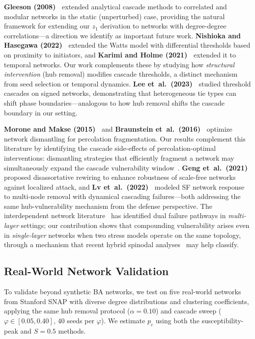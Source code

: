 \documentclass[aps,pre,twocolumn,superscriptaddress,showpacs]{revtex4-2}
\newcommand{\pc}{p_c}
\begin{document}
\textbf{Gleeson (2008)~\cite{Gleeson2008}} extended analytical cascade methods to correlated and modular networks in the static (unperturbed) case, providing the natural framework for extending our $z_1$ derivation to networks with degree-degree correlations---a direction we identify as important future work. \textbf{Nishioka and Hasegawa (2022)~\cite{Nishioka2022}} extended the Watts model with differential thresholds based on proximity to initiators, and \textbf{Karimi and Holme (2021)~\cite{Karimi2021}} extended it to temporal networks. Our work complements these by studying how \emph{structural intervention} (hub removal) modifies cascade thresholds, a distinct mechanism from seed selection or temporal dynamics. \textbf{Lee et~al.\ (2023)~\cite{Lee2023}} studied threshold cascades on signed networks, demonstrating that heterogeneous tie types can shift phase boundaries---analogous to how hub removal shifts the cascade boundary in our setting.

\textbf{Morone and Makse (2015)~\cite{Morone2015}} and \textbf{Braunstein et~al.\ (2016)~\cite{Braunstein2016}} optimize network dismantling for percolation fragmentation. Our results complement this literature by identifying the cascade side-effects of percolation-optimal interventions: dismantling strategies that efficiently fragment a network may simultaneously expand the cascade vulnerability window~\cite{Artime2024}. \textbf{Geng et~al.\ (2021)~\cite{Geng2021}} proposed disassortative rewiring to enhance robustness of scale-free networks against localized attack, and \textbf{Lv et~al.\ (2022)~\cite{Lv2022}} modeled SF network response to multi-node removal with dynamical cascading failures---both addressing the same hub-vulnerability mechanism from the defense perspective. The interdependent network literature~\cite{Xu2021,Brummitt2012} has identified dual failure pathways in \emph{multi-layer} settings; our contribution shows that compounding vulnerability arises even in \emph{single-layer} networks when two stress models operate on the same topology, through a mechanism that recent hybrid spinodal analyses~\cite{Bonamassa2024,Pal2023} may help classify.

\subsection{Real-World Network Validation}
\label{sec:realworld}

To validate beyond synthetic BA networks, we test on five real-world networks from Stanford SNAP with diverse degree distributions and clustering coefficients, applying the same hub removal protocol ($\alpha=0.10$) and cascade sweep ($\varphi \in [0.05, 0.40]$, 40 seeds per $\varphi$). We estimate $\pc$ using both the susceptibility-peak and $S=0.5$ methods.
\end{document}
